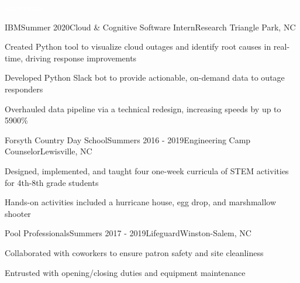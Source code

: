 \documentclass{resume} %
\begin{document}
\begin{rSection}{\colorbox{NCSURED}{\textcolor{WHITE}{Experience}}}
	\begin{rSubsection}{IBM}{Summer 2020}{Cloud \& Cognitive Software Intern}{Research Triangle Park, NC}
		\item Created Python tool to visualize cloud outages and identify root causes in real-time, driving response improvements
		\item Developed Python Slack bot to provide actionable, on-demand data to outage responders
		\item Overhauled data pipeline via a technical redesign, increasing speeds by up to 5900\%
	\end{rSubsection}

	\begin{rSubsection}{Forsyth Country Day School}{Summers 2016 - 2019}{Engineering Camp Counselor}{Lewisville, NC}
		\item Designed, implemented, and taught four one-week curricula of STEM activities for 4th-8th grade students
		\item Hands-on activities included a hurricane house, egg drop, and marshmallow shooter
	\end{rSubsection}

	\begin{rSubsection}{Pool Professionals}{Summers 2017 - 2019}{Lifeguard}{Winston-Salem, NC}
		\item Collaborated with coworkers to ensure patron safety and site cleanliness
		\item Entrusted with opening/closing duties and equipment maintenance  
	\end{rSubsection}	
\end{rSection}
\end{document}
